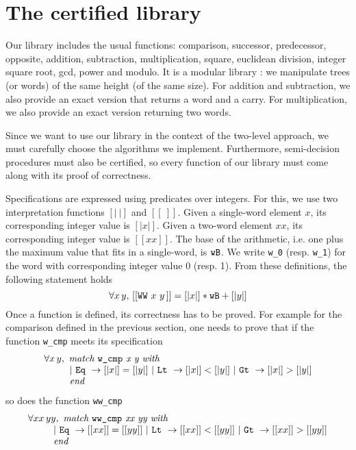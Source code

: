 \section{The certified library \label{Op}}
Our library includes the usual functions:
comparison, successor, predecessor, opposite, addition, subtraction,
multiplication, square, euclidean division, integer square root, gcd, 
power and modulo.
It is a modular library : we manipulate trees (or words)
of the same height (of the same size). 
For addition and subtraction, we also provide an exact version
that returns a word and a carry.
For multiplication, we also provide an exact version
returning two words. 

Since we want to use our library in the context of the two-level approach,
we must carefully choose the algorithms we implement.
Furthermore, semi-decision procedures must also be certified, 
so every function of our library must come along with its proof 
of correctness. 

Specifications are expressed using predicates over integers. For this, 
we use two interpretation functions
{$ [|\ |]$} and {$[[\ ]]$}.
Given a single-word element $x$, its corresponding integer value
is $[|x|]$. Given a two-word element $xx$, its corresponding
integer value is $[[xx]]$. The base of the arithmetic, i.e.
one plus the maximum value that fits in a single-word, is ${\texttt{wB}}$. 
We write {\tt w\_0} (resp. {\tt w\_1}) for the word with 
corresponding integer value 0 (resp. 1).
From these definitions, the following statement holds
$$\forall x\, y,\, [[\texttt{WW}\,\,x\,\,y\,]] = [|x|] * {\texttt{wB}} + [|y|]$$
Once a function is defined, its correctness has to be proved.
For example for the comparison defined in the previous section,
one needs to prove that if the function {\tt w\_cmp} meets its specification
$$\begin{array}{l}
\forall x\, y, \,\, \textit{match {\tt w\_cmp} x y with} \\
\qquad\,\,\,\,
 |\,\, \texttt{Eq}\,\, \rightarrow [|x|] = [|y|]\,\, | \,\,\texttt{Lt}\,\, \rightarrow [|x|] < [|y|] \,\,
| \,\,\texttt{Gt}\,\, \rightarrow [|x|] > [|y|]\\
\qquad\,\,\,\, \textit{end}
\end{array}
$$
so does the function {\tt ww\_cmp}
$$\begin{array}{l}
\forall xx\, yy, \,\, \textit{match {\tt ww\_cmp} xx yy with} \\
\qquad\,\,\,\,
 |\,\, \texttt{Eq}\,\, \rightarrow [[xx]] = [[yy]]\,\, | \,\,\texttt{Lt}\,\, \rightarrow [[xx]] < [[yy]] \,\,
| \,\,\texttt{Gt}\,\, \rightarrow [[xx]] > [[yy]]\\
\qquad\,\,\,\, \textit{end}
\end{array}
$$

